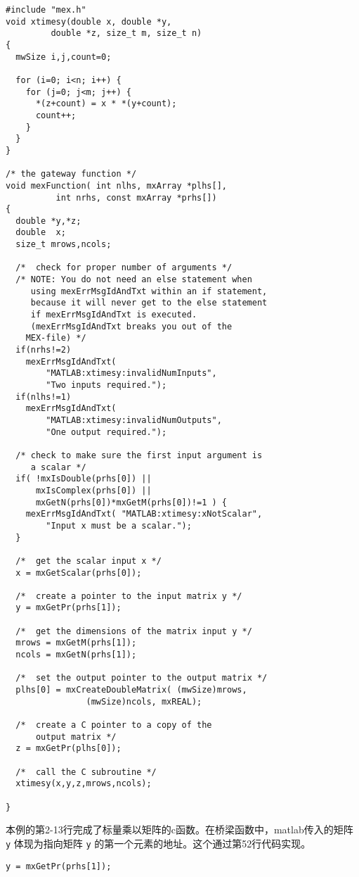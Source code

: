 \documentclass[10pt,a4paper,UTF8]{article}
\begin{document}
\lstset{language=C,label= ,caption= ,captionpos=b,numbers=left}
\begin{lstlisting}
#include "mex.h"
void xtimesy(double x, double *y,
	     double *z, size_t m, size_t n)
{
  mwSize i,j,count=0;

  for (i=0; i<n; i++) {
    for (j=0; j<m; j++) {
      *(z+count) = x * *(y+count);
      count++;
    }
  }
}

/* the gateway function */
void mexFunction( int nlhs, mxArray *plhs[],
		  int nrhs, const mxArray *prhs[])
{
  double *y,*z;
  double  x;
  size_t mrows,ncols;

  /*  check for proper number of arguments */
  /* NOTE: You do not need an else statement when
     using mexErrMsgIdAndTxt within an if statement,
     because it will never get to the else statement
     if mexErrMsgIdAndTxt is executed.
     (mexErrMsgIdAndTxt breaks you out of the
    MEX-file) */
  if(nrhs!=2)
    mexErrMsgIdAndTxt(
	    "MATLAB:xtimesy:invalidNumInputs",
	    "Two inputs required.");
  if(nlhs!=1)
    mexErrMsgIdAndTxt(
	    "MATLAB:xtimesy:invalidNumOutputs",
	    "One output required.");

  /* check to make sure the first input argument is
     a scalar */
  if( !mxIsDouble(prhs[0]) ||
      mxIsComplex(prhs[0]) ||
      mxGetN(prhs[0])*mxGetM(prhs[0])!=1 ) {
    mexErrMsgIdAndTxt( "MATLAB:xtimesy:xNotScalar",
	    "Input x must be a scalar.");
  }

  /*  get the scalar input x */
  x = mxGetScalar(prhs[0]);

  /*  create a pointer to the input matrix y */
  y = mxGetPr(prhs[1]);

  /*  get the dimensions of the matrix input y */
  mrows = mxGetM(prhs[1]);
  ncols = mxGetN(prhs[1]);

  /*  set the output pointer to the output matrix */
  plhs[0] = mxCreateDoubleMatrix( (mwSize)mrows,
			    (mwSize)ncols, mxREAL);

  /*  create a C pointer to a copy of the
      output matrix */
  z = mxGetPr(plhs[0]);

  /*  call the C subroutine */
  xtimesy(x,y,z,mrows,ncols);

}
\end{lstlisting}

本例的第2-13行完成了标量乘以矩阵的c函数。在桥梁函数中，matlab传入的矩阵 \texttt{y} 体现为指向矩阵 \texttt{y} 的第一个元素的地址。这个通过第52行代码实现。
\lstset{language=C,label= ,caption= ,captionpos=b,numbers=none}
\begin{lstlisting}
y = mxGetPr(prhs[1]);
\end{lstlisting}
\end{document}

